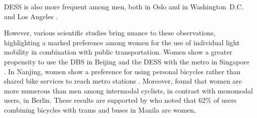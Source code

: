 \begin{refsegment}
\acrshort{DESS} is also more frequent among men, both in Oslo \textcolor{blue}{\autocite[3]{fearnley_patterns_2020}} and in Washington~D.C. and Los Angeles \textcolor{blue}{\autocite[5]{yan_evaluating_2023}}.%

However, various scientific studies bring nuance to these observations, highlighting a marked preference among women for the use of individual light mobility in combination with public transportation. Women show a greater propensity to use the \acrshort{DBS} in Beijing \textcolor{blue}{\autocite[6]{guo_exploring_2023}} and the \acrshort{DESS} with the metro in Singapore \textcolor{blue}{\autocite[182]{cao_e-scooter_2021}}. In Nanjing, women show a preference for using personal bicycles rather than shared bike services to reach metro stations \textcolor{blue}{\autocite[17]{ji_public_2017}}. Moreover, \textcolor{blue}{\textcite[79]{oostendorp_combining_2018}} found that women are more numerous than men among intermodal cyclists, in contrast with monomodal users, in Berlin. These results are supported by \textcolor{blue}{\textcite[245]{fillone_i_2018}} who noted that 62\% of users combining bicycles with trams and buses in Manila are women.%


\end{refsegment}
